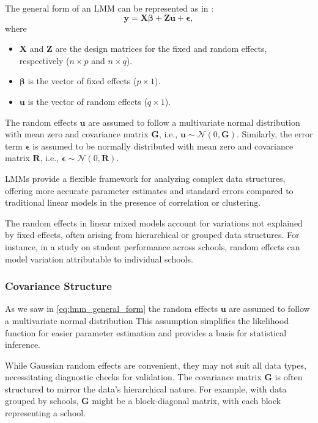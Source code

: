 \documentclass[12pt, twoside,hidelinks]{article}
\theoremstyle{definition}
\numberwithin{equation}{section}
\begin{document}
The general form of an LMM can be represented as in \citet[p.~61]{wood2017}:
\begin{equation}
\mathbf{y} = \mathbf{X}\boldsymbol{\beta} + \mathbf{Z}\boldsymbol{u} + \boldsymbol{\epsilon},
\label{eq:lmm_general_form}
\end{equation}
where
\begin{itemize}
    \item $\mathbf{X}$ and $\mathbf{Z}$ are the design matrices for the fixed and random effects, respectively ($n \times p$ and $n \times q$).
    \item $\boldsymbol{\beta}$ is the vector of fixed effects ($p \times 1$).
    \item $\boldsymbol{u}$ is the vector of random effects ($q \times 1$).
\end{itemize}

The random effects $\boldsymbol{u}$ are assumed to follow a multivariate normal distribution with mean zero and covariance matrix $\mathbf{G}$, i.e., $\boldsymbol{u} \sim \mathcal{N}(0, \mathbf{G})$. Similarly, the error term $\boldsymbol{\epsilon}$ is assumed to be normally distributed with mean zero and covariance matrix $\mathbf{R}$, i.e., $\boldsymbol{\epsilon} \sim \mathcal{N}(0, \mathbf{R})$.
\newline

LMMs provide a flexible framework for analyzing complex data structures, offering more accurate parameter estimates and standard errors compared to traditional linear models in the presence of correlation or clustering.

The random effects in linear mixed models account for variations not explained by fixed effects, often arising from hierarchical or grouped data structures. For instance, in a study on student performance across schools, random effects can model variation attributable to individual schools.    

\subsubsection{Covariance Structure}

As we saw in \ref{eq:lmm_general_form} the random effects $\boldsymbol{u}$ are assumed to follow a multivariate normal distribution This assumption simplifies the likelihood function for easier parameter estimation and provides a basis for statistical inference.

While Gaussian random effects are convenient, they may not suit all data types, necessitating diagnostic checks for validation. The covariance matrix $\mathbf{G}$ is often structured to mirror the data's hierarchical nature. For example, with data grouped by schools, $\mathbf{G}$ might be a block-diagonal matrix, with each block representing a school.
\end{document}
